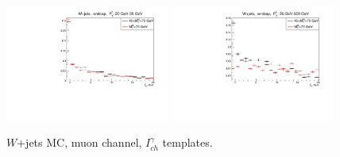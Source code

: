\begin{figure}[htb]
\begin{center}
  \includegraphics[width=0.48\textwidth]{../figs/figs_v11/MUON_WGamma/QuickChecks/cTemplatesVsWMt_Wjets_phoPFChIsoCorr_ENDCAP_pt20to35.pdf} \includegraphics[width=0.48\textwidth]{../figs/figs_v11/MUON_WGamma/QuickChecks/cTemplatesVsWMt_Wjets_phoPFChIsoCorr_ENDCAP_pt35to500.pdf}\\
  \caption{$W$+jets MC, muon channel, $I_{ch}^{\gamma}$ templates.}
  \label{fig:templatesVsWMt_Wjets_CHISO}
  \end{center}
\end{figure}

